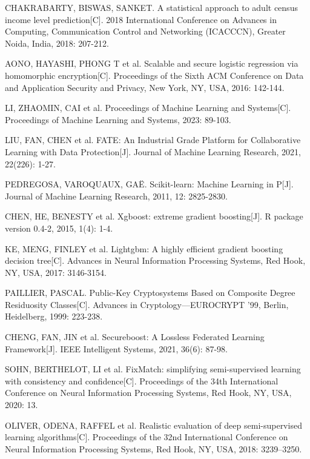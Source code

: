 \begin{thebibliography}{200}
	CHAKRABARTY, BISWAS, SANKET. A statistical approach to adult census income level prediction[C]. 2018 International Conference on Advances in Computing, Communication Control and Networking (ICACCCN), Greater Noida, India, 2018: 207-212.

	AONO, HAYASHI, PHONG T et al. Scalable and secure logistic regression via homomorphic encryption[C]. Proceedings of the Sixth ACM Conference on Data and Application Security and Privacy, New York, NY, USA, 2016: 142-144.

	LI, ZHAOMIN, CAI et al. Proceedings of Machine Learning and Systems[C]. Proceedings of Machine Learning and Systems, 2023: 89-103.

	LIU, FAN, CHEN et al. FATE: An Industrial Grade Platform for Collaborative Learning with Data Protection[J]. Journal of Machine Learning Research, 2021, 22(226): 1-27.

	PEDREGOSA, VAROQUAUX, GA\"E. Scikit-learn: Machine Learning in P[J]. Journal of Machine Learning Research, 2011, 12: 2825-2830.

	CHEN, HE, BENESTY et al. Xgboost: extreme gradient boosting[J]. R package version 0.4-2, 2015, 1(4): 1-4.

	KE, MENG, FINLEY et al. Lightgbm: A highly efficient gradient boosting decision tree[C]. Advances in Neural Information Processing Systems, Red Hook, NY, USA, 2017: 3146-3154.

	PAILLIER, PASCAL. Public-Key Cryptosystems Based on Composite Degree Residuosity Classes[C]. Advances in Cryptology---EUROCRYPT '99, Berlin, Heidelberg, 1999: 223-238.

	CHENG, FAN, JIN et al. Secureboost: A Lossless Federated Learning Framework[J]. IEEE Intelligent Systems, 2021, 36(6): 87-98.

	SOHN, BERTHELOT, LI et al. FixMatch: simplifying semi-supervised learning with consistency and confidence[C]. Proceedings of the 34th International Conference on Neural Information Processing Systems, Red Hook, NY, USA, 2020: 13.

	OLIVER, ODENA, RAFFEL et al. Realistic evaluation of deep semi-supervised learning algorithms[C]. Proceedings of the 32nd International Conference on Neural Information Processing Systems, Red Hook, NY, USA, 2018: 3239–3250.


\end{thebibliography}
